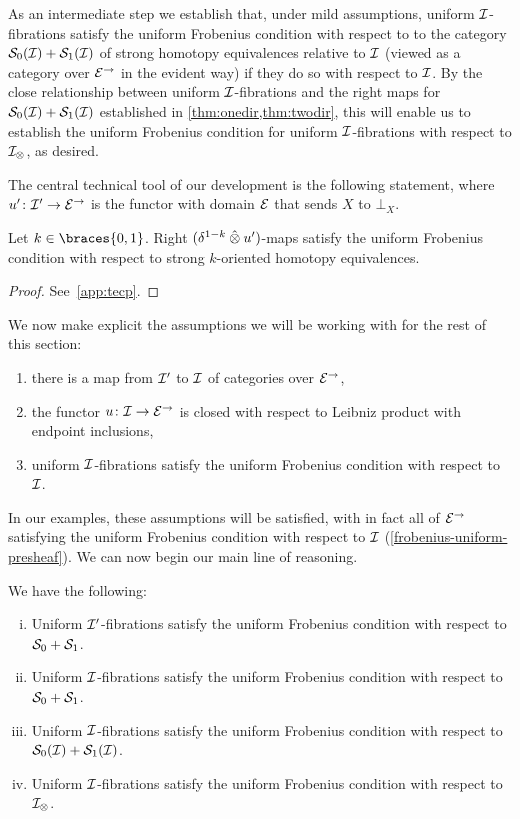 \documentclass[reqno,10pt,a4paper,oneside,draft]{amsart}
\begin{document}
As an intermediate step we establish that,  under mild assumptions, uniform $\cal{I}$-fibrations satisfy the uniform Frobenius condition with respect to to the category $\cal{S}_0(\cal{I}) + \cal{S}_1(\cal{I})$ of strong homotopy equivalences relative to $\cal{I}$ (viewed as a category over $\cal{E}^\to$ in the evident way) if they do so with respect to $\cal{I}$.
By the close relationship between uniform $\cal{I}$-fibrations and the right maps for $\cal{S}_0(\cal{I}) + \cal{S}_1(\cal{I})$ established in \cref{thm:onedir,thm:twodir}, this will enable us to establish the uniform Frobenius condition for uniform $\cal{I}$-fibrations with respect to $\cal{I}_\otimes$, as desired.


The central technical tool of our development is the following statement, where
$u' \co \cal{I}' \to \cal{E}^\to$ is the functor with domain $\cal{E}$ that sends $X$ to $\bot_X$.

\begin{lemma} \label{technical}
Let $k \in \braces{0, 1}$.
Right $(\delta^{1-k} \hatotimes u')$-maps satisfy the uniform Frobenius condition with respect to strong $k$-oriented homotopy equivalences.
\end{lemma}

\begin{proof}
See~\cref{app:tecp}.
\end{proof}

We now make explicit the assumptions we will be working with for the rest of this section:
\begin{enumerate}[(1)]
\item 
there is a map from $\cal{I}'$ to $\cal{I}$ of categories over $\cal{E}^\to$,
\item
the functor $u \co \cal{I} \to \catE^\to$ is closed with respect to Leibniz product with endpoint inclusions,
\item
uniform $\cal{I}$-fibrations satisfy the uniform Frobenius condition with respect to $\cal{I}$.
\end{enumerate}
In our examples, these assumptions will be satisfied, with in fact all of $\catE^\to$ satisfying the uniform Frobenius condition with respect to $\cal{I}$ (\cref{frobenius-uniform-presheaf}).
We can now begin our main line of reasoning.

\begin{proposition}
We have the following:
\begin{enumerate}[(i)]
\item 
Uniform $\cal{I}'$-fibrations satisfy the uniform Frobenius condition with respect to $\cal{S}_0 + \cal{S}_1$.
\item
Uniform $\cal{I}$-fibrations satisfy the uniform Frobenius condition with respect to $\cal{S}_0 + \cal{S}_1$.
\item
Uniform $\cal{I}$-fibrations satisfy the uniform Frobenius condition with respect to $\cal{S}_0(\cal{I}) + \cal{S}_1(\cal{I})$.
\item
Uniform $\cal{I}$-fibrations satisfy the uniform Frobenius condition with respect to $\cal{I}_\otimes$.
\end{enumerate}
\end{proposition}
\end{document}
